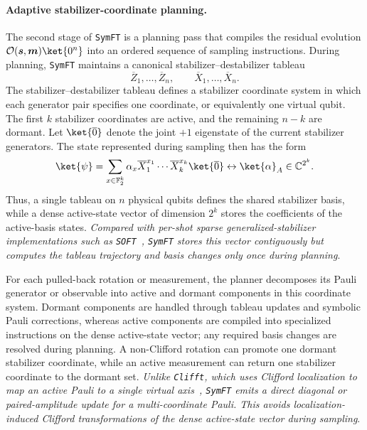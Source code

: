 \documentclass[a4paper,onecolumn,unpublished]{quantumarticle}
\DeclarePairedDelimiter\rbra{\lparen}{\rparen}
\newcommand{\tFont}[1]{\texttt{#1}}
\newcommand{\symft}{\tFont{SymFT}}
\newcommand{\soft}{\tFont{SOFT}}
\newcommand{\clifft}{\tFont{Clifft}}
\newcommand{\cO}{\mathcal{O}}
\newcommand{\CC}{\mathbb{C}}
\newcommand{\FF}{\mathbb{F}}
\begin{document}
\paragraph{Adaptive stabilizer-coordinate planning.}
The second stage of \symft{} is a planning pass that compiles the residual evolution $\cO\rbra{\bm{s},\bm{m}}\ket{0^n}$ into an ordered sequence of sampling instructions.
During planning, \symft{} maintains a canonical stabilizer--destabilizer tableau
\begin{equation*}
    \overline{Z}_1,\ldots,\overline{Z}_n,
    \qquad
    \overline{X}_1,\ldots,\overline{X}_n.
\end{equation*}
The stabilizer--destabilizer tableau defines a stabilizer coordinate system in which each generator pair specifies one coordinate, or equivalently one virtual qubit.
The first $k$ stabilizer coordinates are active, and the remaining $n-k$ are dormant.
Let $\ket{\overline{0}}$ denote the joint $+1$ eigenstate of the current stabilizer generators.
The state represented during sampling then has the form
\begin{equation*}
    \ket{\psi} = \sum_{x\in\FF_2^k}
    \alpha_x \overline{X}_1^{x_1}\cdots \overline{X}_k^{x_k} \ket{\overline 0} \leftrightarrow
    \ket{\alpha}_A\in\CC^{2^k}.
\end{equation*}
Thus, a single tableau on $n$ physical qubits defines the shared stabilizer basis, while a dense active-state vector of dimension $2^k$ stores the coefficients of the active-basis states.
\emph{Compared with per-shot sparse generalized-stabilizer implementations such as \soft{}~\cite{LZZ+25}, \symft{} stores this vector contiguously but computes the tableau trajectory and basis changes only once during planning}.

For each pulled-back rotation or measurement, the planner decomposes its Pauli generator or observable into active and dormant components in this coordinate system.
Dormant components are handled through tableau updates and symbolic Pauli corrections, whereas active components are compiled into specialized instructions on the dense active-state vector; any required basis changes are resolved during planning.
A non-Clifford rotation can promote one dormant stabilizer coordinate, while an active measurement can return one stabilizer coordinate to the dormant set.
\emph{Unlike \clifft{}, which uses Clifford localization to map an active Pauli to a single virtual axis~\cite{CL26}, \symft{} emits a direct diagonal or paired-amplitude update for a multi-coordinate Pauli.
This avoids localization-induced Clifford transformations of the dense active-state vector during sampling}.
\end{document}
